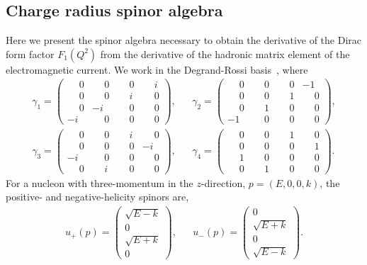 \documentclass[prd,aps,twocolumn,superscriptaddress,tightenlines,nofootinbib,floatfix,preprintnumbers,10pt]{revtex4-1}
\begin{document}
\subsection{Charge radius spinor algebra}
Here we present the spinor algebra necessary to obtain the derivative of the Dirac form factor $F_1(Q^2)$ from the derivative of the hadronic matrix element of the electromagnetic current.
We work in the Degrand-Rossi basis~\cite{DeGrand:1990dk}, where
%
\begin{align}
\gamma_1 = \begin{pmatrix}
\phantom{-}0&\phantom{-}0&\phantom{-}0&\phantom{-}i\\
\phantom{-}0&\phantom{-}0&\phantom{-}i&\phantom{-}0\\
\phantom{-}0&-i&\phantom{-}0&\phantom{-}0\\
-i&\phantom{-}0&\phantom{-}0&\phantom{-}0
\end{pmatrix}, &&
\gamma_2=\begin{pmatrix}
\phantom{-}0&\phantom{-}0&\phantom{-}0&-1\\
\phantom{-}0&\phantom{-}0&\phantom{-}1&\phantom{-}0\\
\phantom{-}0&\phantom{-}1&\phantom{-}0&\phantom{-}0\\
-1&\phantom{-}0&\phantom{-}0&\phantom{-}0
\end{pmatrix}, \nonumber\\
\gamma_3=\begin{pmatrix}
\phantom{-}0&\phantom{-}0&\phantom{-}i&\phantom{-}0\\
\phantom{-}0&\phantom{-}0&\phantom{-}0&-i\\
-i&\phantom{-}0&\phantom{-}0&\phantom{-}0\\
\phantom{-}0&\phantom{-}i&\phantom{-}0&\phantom{-}0
\end{pmatrix},
&&
\gamma_4=\begin{pmatrix}
\phantom{-}0&\phantom{-}0&\phantom{-}1&\phantom{-}0\\
\phantom{-}0&\phantom{-}0&\phantom{-}0&\phantom{-}1\\
\phantom{-}1&\phantom{-}0&\phantom{-}0&\phantom{-}0\\
\phantom{-}0&\phantom{-}1&\phantom{-}0&\phantom{-}0
\end{pmatrix}.
\end{align}
%
For a nucleon with three-momentum in the $z$-direction, $p = (E, 0, 0, k)$, the positive- and negative-helicity spinors are,
%
\begin{align}
u_+(p)=\begin{pmatrix}
\sqrt{E-k}\\0\\ \sqrt{E+k}\\0
\end{pmatrix},
&&
u_-(p)=\begin{pmatrix}
0\\ \sqrt{E+k}\\0\\ \sqrt{E-k}
\end{pmatrix}.
\end{align}
\end{document}
